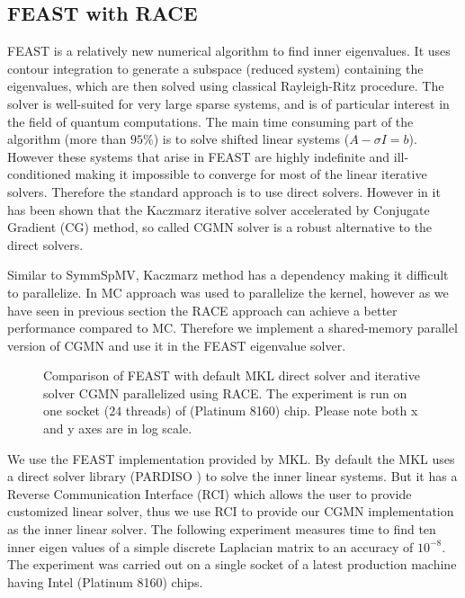 \subsection{FEAST with RACE}
FEAST\cite{FEAST} is a relatively new numerical algorithm to find inner eigenvalues.
It uses contour integration to generate a subspace (reduced system) containing the eigenvalues,
which are then solved using classical Rayleigh-Ritz procedure. The solver is
well-suited for very large sparse systems, and is of particular interest in the field
of quantum computations.
 The main time consuming part of the algorithm (more than $95\%$) is to solve 
 shifted linear systems ($A- \sigma I = b$). However these systems
 that arise in FEAST are highly indefinite and ill-conditioned making it impossible
 to converge for most of the linear iterative solvers. Therefore the standard approach
 is to use direct solvers. However in \cite{feast_mc} it has been shown
 that the Kaczmarz iterative solver accelerated by Conjugate Gradient (CG) method,
 so called CGMN solver \cite{cgmn} is a robust alternative to the direct solvers. 
 
Similar to \acrshort{SymmSpMV}, Kaczmarz method has a \DTWO dependency making
it difficult to parallelize. In \cite{feast_mc} \acrshort{MC} approach was used to
parallelize the kernel, however as we have seen in previous section the \acrshort{RACE}
approach can achieve a better performance compared to \acrshort{MC}. Therefore
we implement a shared-memory parallel version of CGMN and use it in the FEAST eigenvalue
solver.

  \setlength{\belowcaptionskip}{-15pt}
\begin{figure}[tb]
	\centering
	\scalebox{0.56}{}
	\caption{\label{fig:feast} Comparison of FEAST with default \acrshort{MKL} direct solver and 
		iterative solver CGMN parallelized using \acrshort{RACE}. The experiment is
		run on one socket ($24$ threads) of \SKX (Platinum 8160) chip. Please note both x and y axes
		are in log scale.}
\end{figure}
  \setlength{\belowcaptionskip}{0pt}
  
We use the FEAST implementation provided by \acrshort{MKL}. By default the MKL
uses a direct solver library (PARDISO \cite{Pardiso}) to solve the inner linear systems. 
But it has a Reverse Communication Interface (RCI) which allows the user to provide 
customized linear solver, thus we use RCI to provide our CGMN implementation as the inner 
linear solver. The following experiment measures time to find ten inner eigen values 
of a simple discrete Laplacian matrix to an accuracy of $10^{-8}$. The experiment
was carried out on a single socket of a latest production machine having 
Intel \SKX (Platinum 8160) chips.

